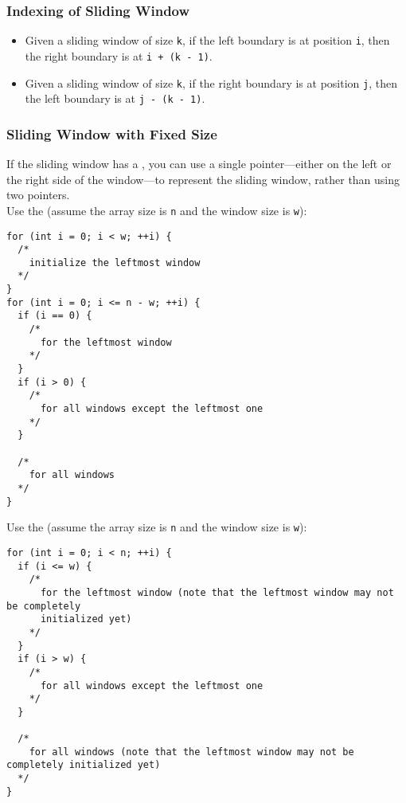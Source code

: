 \subsubsection{Indexing of Sliding Window}
\begin{itemize}
\item Given a sliding window of size \colorbox{CodeBackground}{\lstinline|k|}, if the left boundary is at position \colorbox{CodeBackground}{\lstinline|i|}, then the right boundary is at \colorbox{CodeBackground}{\lstinline|i + (k - 1)|}.
\item Given a sliding window of size \colorbox{CodeBackground}{\lstinline|k|}, if the right boundary is at position \colorbox{CodeBackground}{\lstinline|j|}, then the left boundary is at \colorbox{CodeBackground}{\lstinline|j - (k - 1)|}.
\end{itemize}

\subsubsection{Sliding Window with Fixed Size}
If the sliding window has a {\color{blue}{fixed size}}, you can use a single pointer—either on the left or the right side of the window—to represent the sliding window, rather than using two pointers.\\

Use the {\color{blue}{left side}} (assume the array size is {\colorbox{CodeBackground}{\lstinline|n|}} and the window size is {\colorbox{CodeBackground}{\lstinline|w|}}):
\begin{lstlisting}
for (int i = 0; i < w; ++i) {
  /*
    initialize the leftmost window
  */
}
for (int i = 0; i <= n - w; ++i) {
  if (i == 0) {
    /*
      for the leftmost window
    */
  }
  if (i > 0) {
    /*
      for all windows except the leftmost one
    */
  }

  /*
    for all windows
  */
}
\end{lstlisting}

Use the {\color{blue}{right side}} (assume the array size is {\colorbox{CodeBackground}{\lstinline|n|}} and the window size is {\colorbox{CodeBackground}{\lstinline|w|}}):
\begin{lstlisting}
for (int i = 0; i < n; ++i) {
  if (i <= w) {
    /*
      for the leftmost window (note that the leftmost window may not be completely
      initialized yet)
    */
  }
  if (i > w) {
    /*
      for all windows except the leftmost one
    */
  }

  /*
    for all windows (note that the leftmost window may not be completely initialized yet)
  */
}
\end{lstlisting}

